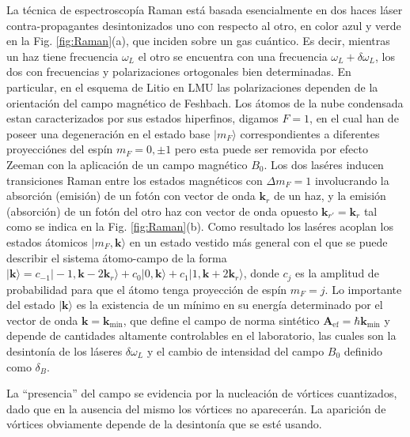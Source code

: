 \documentclass[superscriptaddress,onecolumn,aps,preprint,showpacs,nofootinbib,pra,11pt]{revtex4-2}
\begin{document}
\begin{normalsize}
La técnica de espectroscopía Raman está basada esencialmente en dos haces láser contra-propagantes desintonizados uno con respecto al otro, en color azul y verde en la Fig. \ref{fig:Raman}(a), que inciden sobre un gas cu\'antico. Es decir, mientras un haz tiene frecuencia $\omega_L$ el otro se encuentra con una frecuencia $\omega_L+\delta\omega_L$, los dos con frecuencias y polarizaciones ortogonales bien determinadas. En particular, en el esquema de Litio en LMU las polarizaciones dependen de la orientación del campo magnético de Feshbach. Los \'atomos de la nube condensada estan caracterizados por sus estados hiperfinos, digamos $F=1$, en el cual han de poseer una degeneraci\'on en el estado base $|m_F\rangle$ correspondientes a diferentes proyecci\'ones del esp\'in $m_F=0,\pm 1$ pero esta puede ser removida por efecto Zeeman con la aplicaci\'on de un campo magn\'etico $B_0$. Los dos las\'eres inducen transiciones Raman entre los estados magn\'eticos con $\Delta m_F=1$ involucrando la absorci\'on (emisi\'on) de un fot\'on con vector de onda $\textbf{k}_r$ de un haz, y la emisi\'on (absorci\'on) de un fot\'on del otro haz con vector de onda opuesto $\textbf{k}_{r'}=\textbf{k}_r$ tal como se indica en la Fig. \ref{fig:Raman}(b). Como resultado los las\'eres acoplan los estados \'atomicos $|m_F,\textbf{k}\rangle$ en un estado vestido m\'as general con el que se puede describir el sistema \'atomo-campo de la forma $|\textbf{k}\rangle=c_{-1}|-1,\textbf{k}-2\textbf{k}_r\rangle+c_0|0,\textbf{k}\rangle+c_1|1,\textbf{k}+2\textbf{k}_r\rangle$, donde $c_j$ es la amplitud de probabilidad para que el \'atomo tenga proyecci\'on de esp\'in $m_F=j$. Lo importante del estado $|\textbf{k}\rangle$ es la existencia de un m\'inimo en su energ\'ia determinado por el vector de onda $\textbf{k}=\textbf{k}_{\text{min}}$, que define el campo de norma sint\'etico $\textbf{A}_{\text{ef}}=\hbar\textbf{k}_{\text{min}}$ \cite{Lin-nature462, Lin-naturephys7} y depende de cantidades altamente controlables en el laboratorio, las cuales son la desinton\'ia de los l\'aseres $\delta \omega_L$ y el cambio de intensidad del campo $B_0$ definido como $\delta_B$.

 La ``presencia'' del campo se evidencia por la nucleación de vórtices cuantizados, dado que en la ausencia del mismo los vórtices no aparecerán. La aparición de vórtices obviamente depende de la desintonía que se esté usando.\medskip


\end{normalsize}
\end{document}
